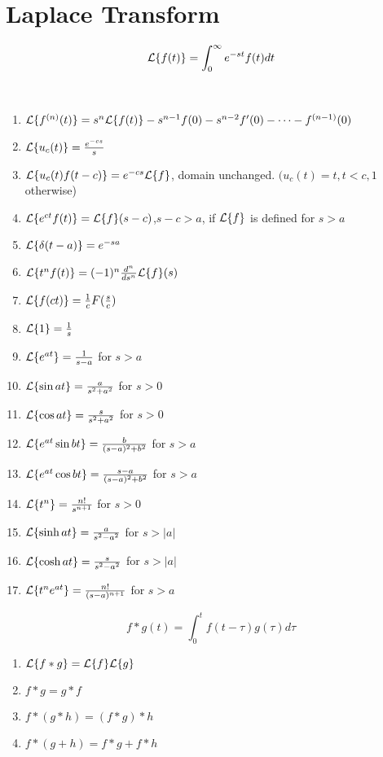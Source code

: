 \documentclass[12pt]{article}
\begin{document}
\section{Laplace Transform}

\begin{definition}
	\begin{equation}
		\mathcal{L}\{f(t)\} = \int_{0}^{\infty} e^{-st} f(t) dt
	\end{equation}
\end{definition}

\begin{theorem}
	\ 
\begin{enumerate}
	\item $\mathcal{L}\{f^{(n)}(t)\} = s^n \mathcal{L}\{f(t)\} - s^{n-1}f(0) - s^{n-2}f'(0) - \cdots - f^{(n-1)}(0)$
	\item $\mathcal{L}\{u_{c}(t)\} = \frac{e^{-cs}}{s}$
	\item $\mathcal{L}\{u_c(t)f(t-c)\} = e^{-cs} \mathcal{L}\{f\}$, domain unchanged. $(u_c(t) = t, t<c, 1$ otherwise)
	\item $\mathcal{L}\{e^{ct}f(t)\} = \mathcal{L}\{f\}(s-c)$,$s-c > a$, if $\mathcal{L}\{f\}$ is defined for $s>a$
	\item $\mathcal{L}\{\delta(t-a)\} = e^{-sa}$
	\item $\mathcal{L}\{t^nf(t)\} = (-1)^n \frac{d^n}{ds^n} \mathcal{L}\{f\}(s)$
	\item $\mathcal{L}\{f(ct)\} = \frac{1}{c}F(\frac{s}{c})$
	\item $\mathcal{L}\{1\} = \frac{1}{s}$
	\item $\mathcal{L}\{e^{at}\} = \frac{1}{s-a}$ for $s>a$
	\item $\mathcal{L}\{\sin{at}\} = \frac{a}{s^2+a^2}$ for $s>0$
	\item $\mathcal{L}\{\cos{at}\} = \frac{s}{s^2+a^2}$ for $s>0$
	\item $\mathcal{L}\{e^{at}\sin{bt}\} = \frac{b}{(s-a)^2+b^2}$ for $s>a$
	\item $\mathcal{L}\{e^{at}\cos{bt}\} = \frac{s-a}{(s-a)^2+b^2}$ for $s>a$
	\item $\mathcal{L}\{t^n\} = \frac{n!}{s^{n+1}}$ for $s>0$
	\item $\mathcal{L}\{\sinh{at}\} = \frac{a}{s^2-a^2}$ for $s>|a|$
	\item $\mathcal{L}\{\cosh{at}\} = \frac{s}{s^2-a^2}$ for $s>|a|$
	\item $\mathcal{L}\{t^n e^{at}\} = \frac{n!}{(s-a)^{n+1}}$ for $s>a$
\end{enumerate}	
\end{theorem}

\begin{theorem}
	$$ f*g(t) =  \int_{0}^{t} f(t-\tau)g(\tau) d\tau$$
	\begin{enumerate}
		\item $\mathcal{L}\{f*g\} = \mathcal{L}\{f\} \mathcal{L}\{g\}$
		\item $f*g = g*f$
		\item $f*(g*h) = (f*g)*h$
		\item $f*(g+h) = f*g + f*h$
	\end{enumerate}
\end{theorem}
\end{document}
